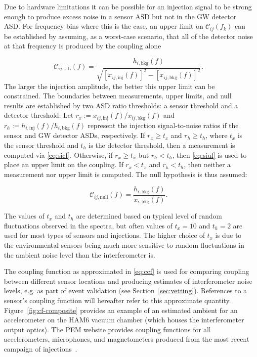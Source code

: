 Due to hardware limitations it can be possible for an injection signal to be strong enough to produce excess noise in a sensor \ac{ASD} but not in the \ac{GW} detector \ac{ASD}.
For frequency bins where this is the case, an upper limit on $\mathcal{C}_{ij}(f_k)$ can be established by assuming, as a worst-case scenario, that all of the detector noise at that frequency is produced by the coupling alone

\begin{equation}\label{eq:siul}
	\mathcal{C}_{ij, \mathrm{UL}}(f) = \frac{h_{i,\textrm{bkg}}(f)}{\sqrt{[x_{ij,\textrm{inj}}(f)]^2 - [x_{ij,\textrm{bkg}}(f)]^2}}.
\end{equation}
The larger the injection amplitude, the better this upper limit can be constrained.
The boundaries between measurements, upper limits, and null results are established by two \ac{ASD} ratio thresholds: a sensor threshold and a detector threshold.
Let $r_x := x_{ij,\textrm{inj}}(f) / x_{ij,\textrm{bkg}}(f)$ and $r_h := h_{i,\textrm{inj}}(f) / h_{i,\textrm{bkg}}(f)$ represent the injection signal-to-noise ratios if the sensor and \ac{GW} detector \acp{ASD}, respectively.
If $r_x \geq t_x$ and $r_h \geq t_h$, where $t_x$ is the sensor threshold and $t_h$ is the detector threshold, then a measurement is computed via \cref{eq:sicf}.
Otherwise, if $r_x \geq t_x$ but $r_h < t_h$, then \cref{eq:siul} is used to place an upper limit on the coupling.
If $r_x < t_x$ and $r_h < t_h$, then neither a measurement nor upper limit is computed.
The null hypothesis is thus assumed:

\begin{equation}\label{eq:sinull}
	\mathcal{C}_{ij, \mathrm{null}}(f) = \frac{h_{i,\textrm{bkg}}(f)}{x_{i,\textrm{bkg}}(f)}.
\end{equation}

The values of $t_x$ and $t_h$ are determined based on typical level of random fluctuations observed in the spectra, but often values of $t_x = 10$ and $t_h = 2$ are used for most types of sensors and injections.
The higher choice of $t_x$ is due to the environmental sensors being much more sensitive to random fluctuations in the ambient noise level than the interferometer is.

The coupling function as approximated in \cref{eq:ccf} is used for comparing coupling between different sensor locations and producing estimates of interferometer noise levels, e.g. as part of event validation (see Section~\ref{sec:vetting}).
References to a sensor's coupling function will hereafter refer to this approximate quantity.
Figure~\ref{fig:cf-composite} provides an example of an estimated ambient for an accelerometer on the HAM6 vacuum chamber (which houses the interferometer output optics).
The \ac{PEM} website provides coupling functions for all accelerometers, microphones, and magnetometers produced from the most recent campaign of injections~\citep{PEM_website}.

